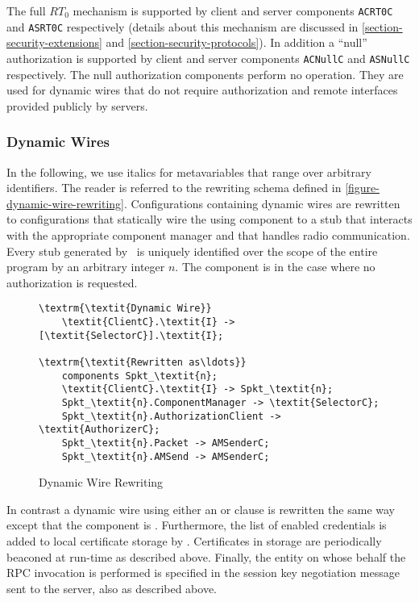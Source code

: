The full $RT_0$ mechanism is supported by client and server components
\texttt{ACRT0C} and \texttt{ASRT0C} respectively (details about this
mechanism are discussed in \autoref{section-security-extensions} and
\autoref{section-security-protocols}). In addition a ``null''
authorization is supported by client and server components
\texttt{ACNullC} and \texttt{ASNullC} respectively. The null
authorization components perform no operation. They are used for
dynamic wires that do not require authorization and remote interfaces
provided publicly by servers.

\subsubsection{Dynamic Wires} In the following, we use italics for
metavariables that range over arbitrary identifiers. The reader is
referred to the rewriting schema defined in
\autoref{figure-dynamic-wire-rewriting}. Configurations containing
dynamic wires are rewritten to configurations that statically wire the
using component  to a stub
 that interacts with the appropriate component
manager  and that handles radio communication.
Every stub generated by \Sprocket\ is uniquely identified over the scope
of the entire program by an arbitrary integer $n$.
The  component is  in the case
where no authorization is requested.

\begin{figure}[!t]
\begin{textbox}{3.0in}
\begin{Verbatim}[commandchars=\\\{\}, fontsize=\small]
\textrm{\textit{Dynamic Wire}}
    \textit{ClientC}.\textit{I} -> [\textit{SelectorC}].\textit{I};

\textrm{\textit{Rewritten as\ldots}}
    components Spkt_\textit{n};
    \textit{ClientC}.\textit{I} -> Spkt_\textit{n};
    Spkt_\textit{n}.ComponentManager -> \textit{SelectorC};
    Spkt_\textit{n}.AuthorizationClient -> \textit{AuthorizerC};
    Spkt_\textit{n}.Packet -> AMSenderC;
    Spkt_\textit{n}.AMSend -> AMSenderC;
\end{Verbatim}
\end{textbox}
\caption{Dynamic Wire Rewriting}
\label{figure-dynamic-wire-rewriting}
\end{figure}

In contrast a dynamic wire using either an  or 
clause is rewritten the same way except that the
 component is . Furthermore, the
list of enabled credentials is added to local certificate storage by
\Sprocket. Certificates in storage are periodically beaconed at
run-time as described above. Finally, the entity on whose behalf the RPC
invocation is performed is specified in the session key negotiation
message sent to the server, also as described above.

